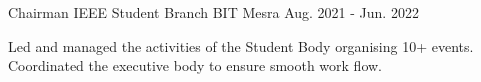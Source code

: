 

\begin{cventries}

  \cventry
    {Chairman} %
    {IEEE Student Branch} %
    {BIT Mesra} %
    {Aug. 2021 - Jun. 2022} %
    {
      \begin{cvitems} %
        \item {Led  and managed the activities of the Student Body organising 10+ events. Coordinated the executive body to ensure smooth work flow.}
      \end{cvitems}
    }
\end{cventries}
